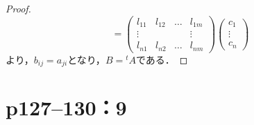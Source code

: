 \documentclass[a4paper,10pt,fleqn]{ltjsarticle}
\begin{document}
\begin{tleftbar}
\begin{proof}
\[            =
            \begin{pmatrix} l_{11} & l_{12} & \dots & l_{1m} \\ \vdots & & & \vdots \\ l_{n1} & l_{n2} & \dots & l_{nm} \end{pmatrix}
            \begin{pmatrix} c_1 \\ \vdots \\ c_n \end{pmatrix}
        \]
        より，$b_{ij}=a_{ji}$となり，$B= {}^t A$である．
    \end{proof}
\end{tleftbar}

\newpage

\section*{p127--130：9}
\end{document}
